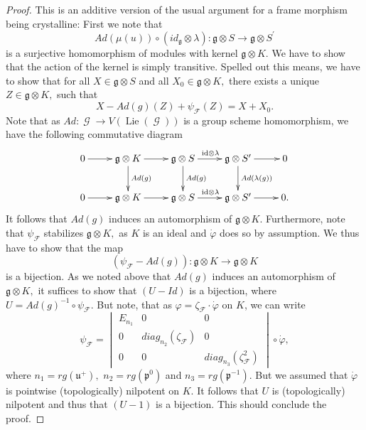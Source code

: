 \documentclass[a4paper,10,5 pt]{amsart}
\theoremstyle{definition}
\DeclareMathOperator{\Lie}{Lie}
\DeclareMathOperator{\G}{\mathcal{G}}
\newcommand{\id}{\mathrm{id}}
\begin{document}
\begin{proof}
This is an additive version of the usual argument for a frame morphism being crystalline: First we note that
$$Ad(\mu(u))\circ (id_{\mathfrak{g}}\otimes \lambda)\colon \mathfrak{g}\otimes S \rightarrow \mathfrak{g}\otimes S^{\prime}$$ is a surjective homomorphism of modules with kernel $\mathfrak{g}\otimes K.$ We have to show that the action of the kernel is simply transitive. Spelled out this means, we have to show that for all $X\in \mathfrak{g}\otimes S$ and all $X_{0}\in \mathfrak{g}\otimes K,$ there exists a unique $Z\in \mathfrak{g}\otimes K,$ such that
\begin{equation}
X-Ad(g)(Z)+\psi_{\mathcal{F}}(Z)=X+X_{0}.
\end{equation}
Note that as $Ad\colon \G\rightarrow V(\Lie(\G))$ is a group scheme homomorphism, we have the following commutative diagram
$$
\xymatrix{
0 \ar[r] & \mathfrak{g}\otimes K \ar[r] \ar[d]^{Ad(g)} & \mathfrak{g} \otimes S \ar[r]^{\id \otimes \lambda} \ar[d]^{Ad(g)} & \mathfrak{g} \otimes S^{\prime} \ar[d]^{Ad(\lambda(g))} \ar[r] & 0
\\
0 \ar[r] & \mathfrak{g}\otimes K \ar[r] & \mathfrak{g} \otimes S \ar[r]^{\id \otimes \lambda} & \mathfrak{g} \otimes S^{\prime} \ar[r] & 0.
}
$$
It follows that $Ad(g)$ induces an automorphism of $\mathfrak{g}\otimes K.$ Furthermore, note that $\psi_{\mathcal{F}}$ stabilizes $\mathfrak{g}\otimes K,$ as $K$ is an ideal and $\dot{\varphi}$ does so by assumption.
We thus have to show that the map
$$
(\psi_{\mathcal{F}}-Ad(g))\colon \mathfrak{g}\otimes K \rightarrow \mathfrak{g} \otimes K
$$
is a bijection. As we noted above that $Ad(g)$ induces an automorphism of $\mathfrak{g}\otimes K,$ it suffices to show that $(U-Id)$ is a bijection, where $U=Ad(g)^{-1}\circ \psi_{\mathcal{F}}.$ But note, that as $\varphi=\zeta_{\mathcal{F}}\cdot \dot{\varphi}$ on $K$, we can write
$$
\psi_{\mathcal{F}}=\begin{vmatrix}
E_{n_{1}}& 0 &0 \\
0 & diag_{n_{2}}(\zeta_{\mathcal{F}})& 0 \\
0 & 0 & diag_{n_{3}}(\zeta_{\mathcal{F}}^{2})
\end{vmatrix} \circ \dot{\varphi},
$$
where $n_{1}=rg(\mathfrak{u}^{+}),$ $n_{2}=rg(\mathfrak{p}^{0})$ and $n_{3}=rg(\mathfrak{p}^{-1}).$ But we assumed that $\dot{\varphi}$ is pointwise (topologically) nilpotent on $K$. It follows that $U$ is (topologically) nilpotent and thus that $(U-1)$ is a bijection. This should conclude the proof.
\end{proof}
\end{document}
